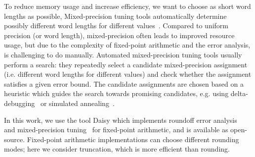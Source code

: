 To reduce memory usage and increase efficiency, we want to choose as short word
lengths as possible,  Mixed-precision tuning tools automatically determine possibly different
word lengths for different values~\cite{DaisyTuning,Lee2006}. Compared to uniform precision (or word length),
mixed-precision often leads to improved resource usage, but due to the complexity of
fixed-point arithmetic and the error analysis, is challenging to do manually.  
Automated mixed-precision tuning tools usually perform a search: they repeatedly
select a candidate mixed-precision assignment (i.e. different word lengths for
different values) and check whether the assignment satisfies a given error
bound. The candidate assignments are chosen based on a heuristic which guides
the search towards promising candidates, e.g. using delta-debugging~\cite{DaisyTuning} or
simulated annealing~\cite{Lee2006}.

In this work, we use the tool Daisy which implements roundoff error
analysis~\cite{Daisy} and mixed-precision tuning~\cite{DaisyTuning} for fixed-point arithmetic, and is
available as open-source. Fixed-point arithmetic implementations can choose different
rounding modes; here we consider truncation, which is more efficient than
rounding.